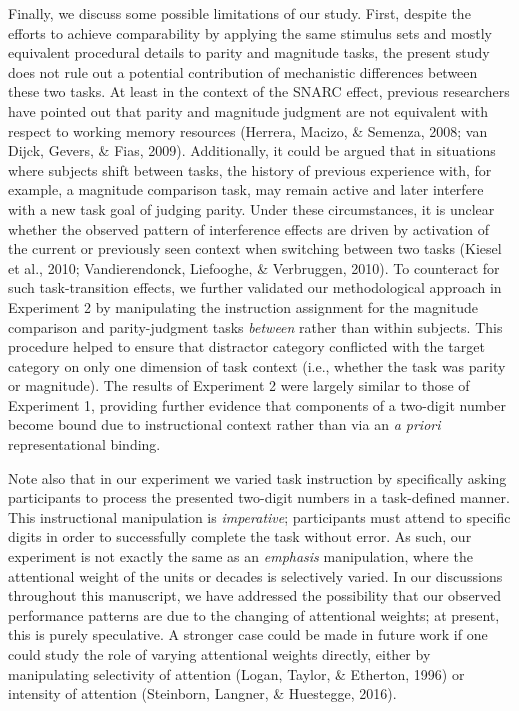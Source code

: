 \documentclass[english,man]{apa6}
\theoremstyle{definition}
\theoremstyle{definition}
\theoremstyle{definition}
\theoremstyle{remark}
\begin{document}
Finally, we discuss some possible limitations of our study. First,
despite the efforts to achieve comparability by applying the same
stimulus sets and mostly equivalent procedural details to parity and
magnitude tasks, the present study does not rule out a potential
contribution of mechanistic differences between these two tasks. At
least in the context of the SNARC effect, previous researchers have
pointed out that parity and magnitude judgment are not equivalent with
respect to working memory resources (Herrera, Macizo, \& Semenza, 2008;
van Dijck, Gevers, \& Fias, 2009). Additionally, it could be argued that
in situations where subjects shift between tasks, the history of
previous experience with, for example, a magnitude comparison task, may
remain active and later interfere with a new task goal of judging
parity. Under these circumstances, it is unclear whether the observed
pattern of interference effects are driven by activation of the current
or previously seen context when switching between two tasks (Kiesel et
al., 2010; Vandierendonck, Liefooghe, \& Verbruggen, 2010). To
counteract for such task-transition effects, we further validated our
methodological approach in Experiment 2 by manipulating the instruction
assignment for the magnitude comparison and parity-judgment tasks
\emph{between} rather than within subjects. This procedure helped to
ensure that distractor category conflicted with the target category on
only one dimension of task context (i.e., whether the task was parity or
magnitude). The results of Experiment 2 were largely similar to those of
Experiment 1, providing further evidence that components of a two-digit
number become bound due to instructional context rather than via an
\emph{a priori} representational binding.

Note also that in our experiment we varied task instruction by
specifically asking participants to process the presented two-digit
numbers in a task-defined manner. This instructional manipulation is
\emph{imperative}; participants must attend to specific digits in order
to successfully complete the task without error. As such, our experiment
is not exactly the same as an \emph{emphasis} manipulation, where the
attentional weight of the units or decades is selectively varied. In our
discussions throughout this manuscript, we have addressed the
possibility that our observed performance patterns are due to the
changing of attentional weights; at present, this is purely speculative.
A stronger case could be made in future work if one could study the role
of varying attentional weights directly, either by manipulating
selectivity of attention (Logan, Taylor, \& Etherton, 1996) or intensity
of attention (Steinborn, Langner, \& Huestegge, 2016).
\end{document}

